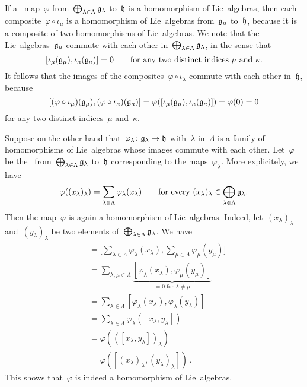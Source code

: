 \begin{example}
	If a~\linear{$\kf$} map~$\varphi$ from~$\bigoplus_{\lambda \in \Lambda} \mathfrak{g}_\lambda$ to~$\mathfrak{h}$ is a homomorphism of Lie~algebras, then each composite~$\varphi \circ \iota_\mu$ is a homomorphism of Lie~algebras from~$\mathfrak{g}_\mu$ to~$\mathfrak{h}$, because it is a composite of two homomorphisms of Lie~algebras.
	We note that the Lie~algebras~$\mathfrak{g}_\mu$ commute with each other in~$\bigoplus_{\lambda \in \Lambda} \mathfrak{g}_\lambda$, in the sense that
	\[
		[ \iota_\mu(\mathfrak{g}_\mu), \iota_\kappa(\mathfrak{g}_\kappa) ] = 0
		\qquad
		\text{for any two distinct indices~$\mu$ and~$\kappa$}.
	\]
	It follows that the images of the composites~$\varphi \circ \iota_\lambda$ commute with each other in~$\mathfrak{h}$, because
	\[
		[
			(\varphi \circ \iota_\mu)(\mathfrak{g}_\mu),
			(\varphi \circ \iota_\kappa)(\mathfrak{g}_\kappa)
		]
		=
		\varphi( [\iota_\mu(\mathfrak{g}_\mu), \iota_\kappa(\mathfrak{g}_\kappa)] )
		=
		\varphi(0)
		=
		0
	\]
	for any two distinct indices~$\mu$ and~$\kappa$.

	Suppose on the other hand that~$\varphi_\lambda \colon \glie_\lambda \to \hlie$ with~$\lambda$ in~$\Lambda$ is a family of homomorphisms of Lie~algebras whose images commute with each other.
	Let~$\varphi$ be the~\linear{$\kf$} from~$\bigoplus_{\lambda \in \Lambda} \mathfrak{g}_\lambda$ to~$\mathfrak{h}$ corresponding to the maps~$\varphi_\lambda$.
	More explicitely, we have
	\[
		\varphi( (x_\lambda)_\lambda )
		=
		\sum_{\lambda \in \Lambda}
		\varphi_\lambda(x_\lambda)
		\qquad
		\text{for every~$(x_\lambda)_\lambda \in \bigoplus_{\lambda \in \Lambda} \mathfrak{g}_\lambda$.}
	\]
	Then the map~$\varphi$ is again a homomorphism of Lie~algebras.
	Indeed, let~$(x_\lambda)_\lambda$ and~$(y_\lambda)_\lambda$ be two elements of~$\bigoplus_{\lambda \in \Lambda} \mathfrak{g}_\lambda$.
	We have
	\begin{align*}
		[
			\varphi( (x_\lambda)_\lambda ),
			\varphi( (y_\lambda)_\lambda )
		]
		&=
		\Biggl[
			\sum_{\lambda \in \Lambda}
			\varphi_\lambda( x_\lambda ) ,
			\sum_{\mu \in \Lambda}
			\varphi_\mu( y_\mu )
		\Biggr]
		\\
		&=
		\sum_{\lambda, \mu \in \Lambda}
		\underbrace{
			[ \varphi_\lambda( x_\lambda ) , \varphi_\mu( y_\mu ) ]
		}_{
			\text{$= 0$ for~$\lambda \neq \mu$}
		}
		\\
		&=
		\sum_{\lambda \in \Lambda} [ \varphi_\lambda( x_\lambda ), \varphi_\lambda( y_\lambda ) ]
		\\
		&=
		\sum_{\lambda \in \Lambda} \varphi_\lambda( [ x_\lambda , y_\lambda ] )
		\\
		&=
		\varphi( ([x_\lambda, y_\lambda])_\lambda )
		\\
		&=
		\varphi( [ (x_\lambda)_\lambda, (y_\lambda)_\lambda ] ) \,.
	\end{align*}
	This shows that~$\varphi$ is indeed a homomorphism of Lie~algebras.


\end{example}
